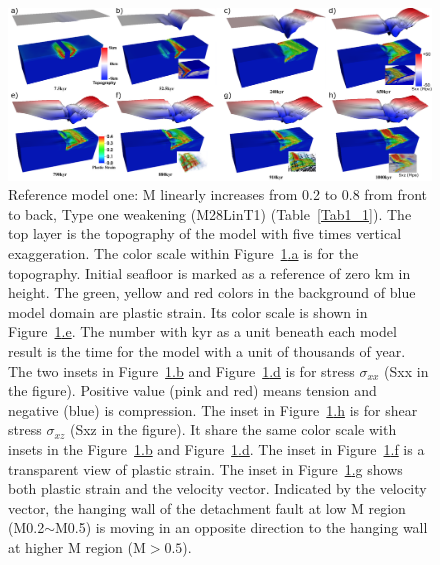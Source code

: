 \begin{figure}[h]
  \centering
    \includegraphics[width=1.0\textwidth]{fig_Results1_1.png}
  \caption{Reference model one: M linearly increases from 0.2 to 0.8 from front to back, Type one weakening (M28LinT1) (Table~\hyperref[Tab1_1]{\ref{Tab1_1}}). The top layer is the topography of the model with five times vertical exaggeration. The color scale within Figure~\hyperref[fig_Results1_1]{\ref{fig_Results1_1}.a} is for the topography. Initial seafloor is marked as a reference of zero km in height.  The green, yellow and red colors in the background of blue model domain are plastic strain. Its color scale is shown in Figure~\hyperref[fig_Results1_1]{\ref{fig_Results1_1}.e}. The number with kyr as a unit beneath each model result is the time for the model with a unit of thousands of year. The two insets in Figure~\hyperref[fig_Results1_1]{\ref{fig_Results1_1}.b} and Figure~\hyperref[fig_Results1_1]{\ref{fig_Results1_1}.d} is for stress $\sigma_{xx}$ (Sxx in the figure). Positive value (pink and red) means tension and negative (blue) is compression. The inset in Figure~\hyperref[fig_Results1_1]{\ref{fig_Results1_1}.h} is for shear stress $\sigma_{xz}$ (Sxz in the figure). It share the same color scale with insets in the Figure~\hyperref[fig_Results1_1]{\ref{fig_Results1_1}.b} and Figure~\hyperref[fig_Results1_1]{\ref{fig_Results1_1}.d}. The inset in Figure~\hyperref[fig_Results1_1]{\ref{fig_Results1_1}.f} is a transparent view of plastic strain. The inset in Figure~\hyperref[fig_Results1_1]{\ref{fig_Results1_1}.g} shows both plastic strain and the velocity vector. Indicated by the velocity vector, the hanging wall of the detachment fault at low M region (M0.2$\sim$M0.5) is moving in an opposite direction to the hanging wall at higher M region (M$>0.5$).} %
 \label{fig_Results1_1}
\end{figure}   

